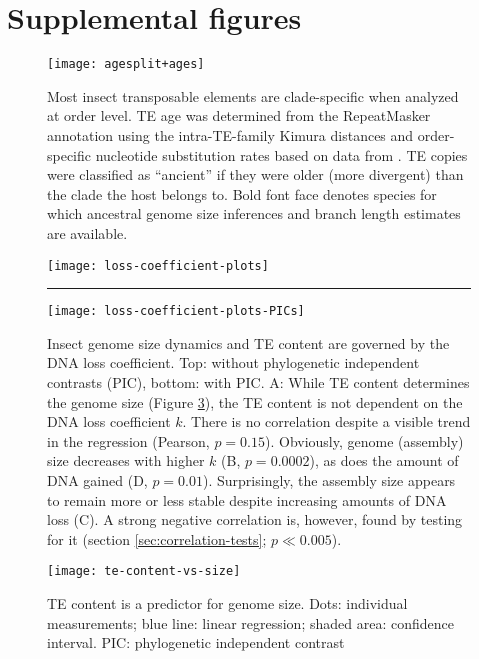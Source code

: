 \section{Supplemental figures}

\begin{figure}[h!]
\centering
\texttt{[image: agesplit+ages]}
\caption[Most insect TEs are clade-specific]{Most insect transposable elements are clade-specific when analyzed at order level. TE age was determined from the RepeatMasker \citep{Smit2015} annotation using the intra-TE-family Kimura distances and order-specific nucleotide substitution rates based on data from \citet{Misof2014}. TE copies were classified as ``ancient'' if they were older (more divergent) than the clade the host belongs to. Bold font face denotes species for which ancestral genome size inferences and branch length estimates are available.}
\label{fig:agesplit}
\end{figure}

\begin{figure}[h!]
\centering
\texttt{[image: loss-coefficient-plots]}
\rule{\textwidth}{0.2pt}

\bigskip

\texttt{[image: loss-coefficient-plots-PICs]}
\caption[DNA loss coefficient correlations, with and without PIC]{Insect genome size dynamics and TE content are governed by the DNA loss coefficient. Top: without phylogenetic independent contrasts (PIC), bottom: with PIC. A: While TE content determines the genome size (Figure \ref{fig:te-content-vs-size}), the TE content is not dependent on the DNA loss coefficient $k$. There is no correlation despite a visible trend in the regression (Pearson, $p = 0.15$). Obviously, genome (assembly) size decreases with higher $k$ (B, $p = 0.0002$), as does the amount of DNA gained (D, $p = 0.01$). Surprisingly, the assembly size appears to remain more or less stable despite increasing amounts of DNA loss (C). A strong negative correlation is, however, found by testing for it (section \ref{sec:correlation-tests}; $p \ll 0.005$).}
\label{fig:loss-coefficient}
\end{figure}

\begin{figure}
\centering
\texttt{[image: te-content-vs-size]}
\caption[TE content is a predictor for genome size]{TE content is a predictor for genome size. Dots: individual measurements; blue line: linear regression; shaded area: confidence interval. PIC: phylogenetic independent contrast \citep{Felsenstein1985}}
\label{fig:te-content-vs-size}
\end{figure}

